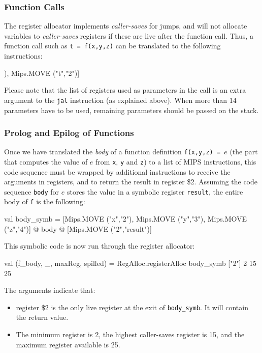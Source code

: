 \documentclass[11pt,a4paper]{article}
\newcommand{\codesize}{\scriptsize}
\newcommand{\cd}[1]{{{\codesize\tt #1}}}
\begin{document}
\subsubsection{Function Calls}
The register allocator implements \emph{caller-saves} for jumps, 
and will not allocate variables to \emph{caller-saves} registers if
these are live after the function call. Thus, a function call such as
\texttt{t = f(x,y,z)} can be translated to the following instructions:

\begin{code}
[Mips.MOVE ("2","x"),
 Mips.MOVE ("3","y"),
 Mips.MOVE ("4","z"),
 Mips.JAL ("f",["2","3","4"]),
 Mips.MOVE ("t","2")]
\end{code}

Please note that the list of registers used as parameters in the call is
an extra argument to the \cd{jal} instruction (as explained above).
When more than 14 parameters have to be used, remaining parameters should 
be passed on the stack.

\subsubsection{Prolog and Epilog of Functions}

Once we have translated the \emph{body} of a function definition 
\cd{f(x,y,z) = $e$} (the part that computes the value of $e$ from 
\cd{x}, \cd{y} and \cd{z}) to a list of MIPS instructions, this code
sequence must be wrapped by additional instructions to receive the
arguments in registers, and to return the result in register \$2.
Assuming the code sequence \cd{body} for $e$ stores the value in 
a symbolic register \cd{result}, the
entire body of \cd{f} is the following:

\begin{code}
val body_symb = [Mips.MOVE ("x","2"),
                 Mips.MOVE ("y","3"),
                 Mips.MOVE ("z","4")]
                @ body @
                [Mips.MOVE ("2","result")]
\end{code}

This symbolic code is now run through the register allocator:

\begin{code}
val (f_body, _, maxReg, spilled) =
        RegAlloc.registerAlloc body_symb ["2"] 2 15 25
\end{code}
The arguments indicate that:
\begin{itemize}
\item register \$2 is the only live register at the exit of \cd{body\_symb}.
	It will contain the return value.
\item The minimum register is 2, the highest caller-saves register is 15,
	 and the maximum register available is 25.
\end{itemize}
\end{document}

